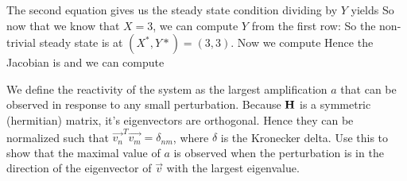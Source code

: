 \solution
The second equation gives us the steady state condition
dividing by $Y$ yields 
So now that we know that $X=3$, we can compute $Y$ from the first row:
So the non-trivial steady state is at $(X^*,Y*)=(3,3).$ Now we compute 
Hence the Jacobian is 
and we can compute 

\subquestion 
We define the reactivity of the system as the largest amplification $a$ that can be observed in response to any small perturbation. Because $\bf H$ is a symmetric (hermitian) matrix, it's eigenvectors are orthogonal. Hence they can be normalized such that $\vec{v_n}^{T}\vec{v_m} = \delta_{nm}$, where $\delta$ is the Kronecker delta. Use this to show that the maximal value of $a$ is observed when the perturbation is in the direction of the eigenvector of $\vec{v}$ with the largest eigenvalue.  

